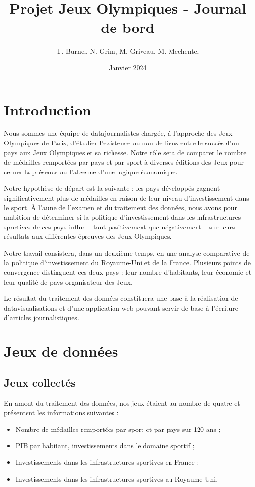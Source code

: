 \documentclass[hidelinks, 12pt]{article}
\title{Projet Jeux Olympiques - Journal de bord}
\date{Janvier 2024}
\author{T. Burnel, N. Grim, M. Griveau, M. Mechentel}
\begin{document}
\maketitle


\section{Introduction}

Nous sommes une équipe de datajournalistes chargée, à l'approche des Jeux Olympiques de Paris, d'étudier l'existence ou non de liens entre le succès d'un pays aux Jeux Olympiques et sa richesse. Notre rôle sera de comparer le nombre de médailles remportées par pays et par sport à diverses éditions des Jeux pour cerner la présence ou l'absence d'une logique économique.

Notre hypothèse de départ est la suivante : les pays développés gagnent significativement plus de médailles en raison de leur niveau d'investissement dans le sport. À l’aune de l’examen et du traitement des données, nous avons pour ambition de déterminer si la politique d’investissement dans les infrastructures sportives de ces pays influe -- tant positivement que négativement -- sur leurs résultats aux différentes épreuves des Jeux Olympiques.

Notre travail consistera, dans un deuxième temps, en une analyse comparative de la politique d'investissement du Royaume-Uni et de la France. Plusieurs points de convergence distinguent ces deux pays : leur nombre d'habitants, leur économie et leur qualité de pays organisateur des Jeux.
	
Le résultat du traitement des données constituera une base à la réalisation de datavisualisations et d'une application web pouvant servir de base à l'écriture d'articles journalistiques.


\section{Jeux de données}

\subsection{Jeux collectés}

En amont du traitement des données, nos jeux étaient au nombre de quatre et présentent les informations suivantes :
\begin{itemize}
\item Nombre de médailles remportées par sport et par pays sur 120 ans\autocite{kaggle} ;
\item PIB par habitant, investissements dans le domaine sportif\autocite{fmi} ;
\item Investissements dans les infrastructures sportives en France\autocite{ministere} ;
\item Investissements dans les infrastructures sportives au Royaume-Uni\autocite{ru}.
\end{itemize}
\end{document}
